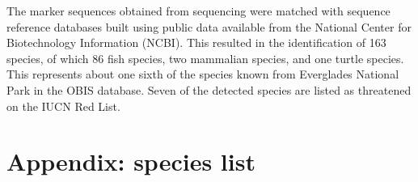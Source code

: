 \documentclass[10pt]{article}
\begin{document}
\begin{multicols}{2}
The marker sequences obtained from sequencing were matched with sequence reference databases built using public data available from the National Center for Biotechnology Information (NCBI). This resulted in the identification of 163 species, of which 86 fish species, two mammalian species, and one turtle species. This represents about one sixth of the species known from Everglades National Park in the OBIS database. Seven of the detected species are listed as threatened on the IUCN Red List.
\end{multicols}





\clearpage

\section*{Appendix: species list}

\begin{landscape}

\end{landscape}
\end{document}
